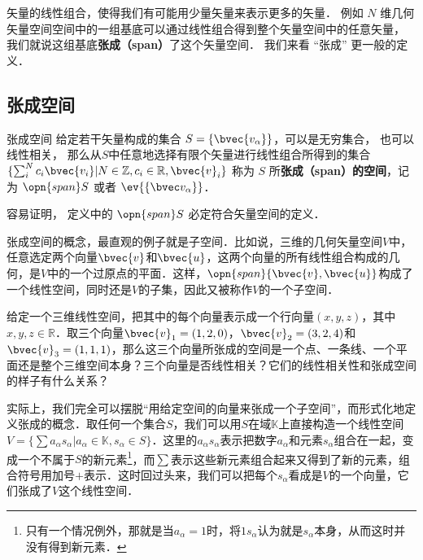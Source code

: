 

矢量的线性组合，使得我们有可能用少量矢量来表示更多的矢量． 例如 $N$ 维几何矢量空间空间中的一组基底可以通过线性组合得到整个矢量空间中的任意矢量， 我们就说这组基底\textbf{张成（span）}了这个矢量空间． 我们来看 “张成” 更一般的定义．

\subsection{张成空间}

\begin{definition}{张成空间}
给定若干矢量构成的集合 $S=\{\bvec{v_\alpha}\}$，可以是无穷集合， 也可以线性相关， 那么从$S$中任意地选择有限个矢量进行线性组合所得到的集合 $\{\sum_i^N c_i\bvec{v_i}|N\in\mathbb{Z}, c_i\in\mathbb{R}, \bvec{v}_i\}$ 称为 $S$ 所\textbf{张成（span）的空间}，记为 $\opn{span} S$ 或者 $\ev{\{\bvec v_\alpha\}}$．
\end{definition}
容易证明， 定义中的 $\opn{span} S$ 必定符合矢量空间的定义．

张成空间的概念，最直观的例子就是子空间．比如说，三维的几何矢量空间$V$中，任意选定两个向量$\bvec{v}$和$\bvec{u}$，这两个向量的所有线性组合构成的几何，是$V$中的一个过原点的平面．这样，$\opn{span}\{\bvec{v}, \bvec{u}\}$构成了一个线性空间，同时还是$V$的子集，因此又被称作$V$的一个子空间．

\begin{exercise}{}
给定一个三维线性空间，把其中的每个向量表示成一个行向量$(x,y,z)$，其中$x,y,z\in\mathbb{R}$．取三个向量$\bvec{v}_1=(1,2,0)$，$\bvec{v}_2=(3,2,4)$和$\bvec{v}_3=(1,1,1)$，那么这三个向量所张成的空间是一个点、一条线、一个平面还是整个三维空间本身？三个向量是否线性相关？它们的线性相关性和张成空间的样子有什么关系？
\end{exercise}

实际上，我们完全可以摆脱“用给定空间的向量来张成一个子空间”，而形式化地定义张成的概念．取任何一个集合$S$，我们可以用$S$在域$\mathbb{K}$上直接构造一个线性空间$V=\{\sum a_\alpha s_\alpha|a_\alpha\in\mathbb{K}, s_\alpha\in S\}$．这里的$a_\alpha s_\alpha$表示把数字$a_\alpha$和元素$s_\alpha$组合在一起，变成一个不属于$S$的新元素\footnote{只有一个情况例外，那就是当$a_\alpha=1$时，将$1s_\alpha$认为就是$s_\alpha$本身，从而这时并没有得到新元素．}，而$\sum$表示这些新元素组合起来又得到了新的元素，组合符号用加号$+$表示．这时回过头来，我们可以把每个$s_\alpha$看成是$V$的一个向量，它们张成了$V$这个线性空间．

